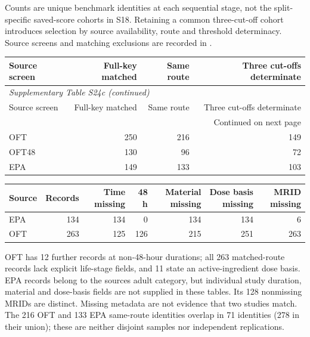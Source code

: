 Counts are unique benchmark identities at each sequential stage, not the split-specific saved-score cohorts in S18. Retaining a common three-cut-off cohort introduces selection by source availability, route and threshold determinacy. Source screens and matching exclusions are recorded in .

\begingroup\small\setlength{\tabcolsep}{4pt}

\begin{longtable}{lrrr}

\toprule Source screen & Full-key matched & Same route & Three cut-offs determinate \\ \midrule\endfirsthead

\multicolumn{4}{l}{\textit{Supplementary Table S24c (continued)}} \\

\toprule Source screen & Full-key matched & Same route & Three cut-offs determinate \\ \midrule\endhead

\midrule\multicolumn{4}{r}{Continued on next page}\\\endfoot\bottomrule\endlastfoot

OFT & 250 & 216 & 149 \\

OFT48 & 130 & 96 & 72 \\

EPA & 149 & 133 & 103 \\

\end{longtable}\endgroup

\begin{longtable}{lrrrrrr}

\toprule Source & Records & Time missing & 48 h & Material missing & Dose basis missing & MRID missing \\ \midrule

EPA & 134 & 134 & 0 & 134 & 134 & 6 \\

OFT & 263 & 125 & 126 & 215 & 251 & 263 \\

\bottomrule\end{longtable}

OFT has 12 further records at non-48-hour durations; all 263 matched-route records lack explicit life-stage fields, and 11 state an active-ingredient dose basis. EPA records belong to the source\textquotesingle s adult category, but individual study duration, material and dose-basis fields are not supplied in these tables. Its 128 nonmissing MRIDs are distinct. Missing metadata are not evidence that two studies match. The 216 OFT and 133 EPA same-route identities overlap in 71 identities (278 in their union); these are neither disjoint samples nor independent replications.

